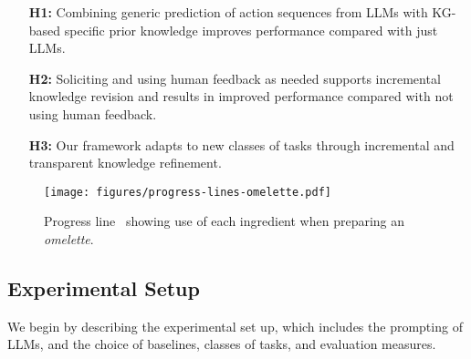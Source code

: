 \begin{itemize}
\vspace{-0.75em}
\item[\textbf{H1:}] Combining generic prediction of action sequences from LLMs with KG-based specific prior knowledge improves performance compared with just LLMs.
\item[\textbf{H2:}] Soliciting and using human feedback as needed supports incremental knowledge revision and results in improved performance compared with not using human feedback.
\item[\textbf{H3:}] Our framework adapts to new classes of tasks through incremental and transparent knowledge refinement.
\vspace{-0.5em}
\end{itemize}

\begin{figure}[tb]
\centering
\captionsetup{font=scriptsize}
\setlength{\belowcaptionskip}{-10pt}
\texttt{[image: figures/progress-lines-omelette.pdf]}
\vspace{-0.75em}
\caption{Progress line~\cite{sakib2024cooking} showing use of each ingredient when preparing an \textit{omelette}.}
\vspace{-6pt}
\label{fig:progress-lines}
\end{figure}

\subsection{Experimental Setup}
\label{sec:expres-setup}
\noindent
We begin by describing the experimental set up, which includes the prompting of LLMs, and the choice of baselines, classes of tasks, and evaluation measures.

